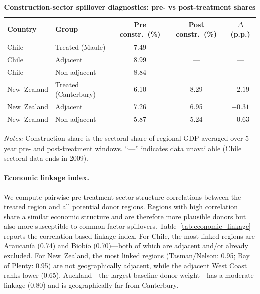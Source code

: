 \documentclass[12pt]{article}
\begin{document}
\begin{table}[H]
\centering
\caption{\textbf{Construction-sector spillover diagnostics: pre- vs post-treatment shares}}
\label{tab:sector_spillover_diagnostics}
\small
\setlength{\tabcolsep}{5pt}
\begin{tabular}{llccc}
\toprule
\textbf{Country} & \textbf{Group} & \textbf{Pre constr.\ (\%)} & \textbf{Post constr.\ (\%)} & \textbf{$\Delta$ (p.p.)} \\
\midrule
Chile & Treated (Maule)      & 7.49 & --- & --- \\
Chile & Adjacent  & 8.99 & --- & --- \\
Chile & Non-adjacent & 8.84 & --- & --- \\
\midrule
New~Zealand & Treated (Canterbury) & 6.10 & 8.29 & $+2.19$ \\
New~Zealand & Adjacent & 7.26 & 6.95 & $-0.31$ \\
New~Zealand & Non-adjacent & 5.87 & 5.24 & $-0.63$ \\
\bottomrule
\end{tabular}
\begin{minipage}{0.95\textwidth}\footnotesize\vspace{1ex}
\textit{Notes:} Construction share is the sectoral share of regional GDP averaged over 5-year pre- and post-treatment windows. ``---'' indicates data unavailable (Chile sectoral data ends in 2009).
\end{minipage}
\end{table}

\paragraph{Economic linkage index.}
We compute pairwise pre-treatment sector-structure correlations between the treated region and all potential donor regions. Regions with high correlation share a similar economic structure and are therefore more plausible donors but also more susceptible to common-factor spillovers. Table~\ref{tab:economic_linkage} reports the correlation-based linkage index. For Chile, the most linked regions are Araucanía (0.74) and Biobío (0.70)---both of which are adjacent and/or already excluded. For New~Zealand, the most linked regions (Tasman/Nelson: 0.95; Bay of Plenty: 0.95) are not geographically adjacent, while the adjacent West Coast ranks lower (0.65). Auckland---the largest baseline donor weight---has a moderate linkage (0.80) and is geographically far from Canterbury.
\end{document}
